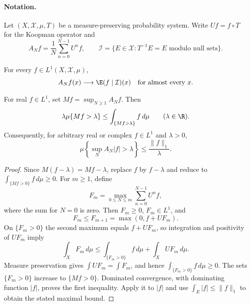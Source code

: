 
\paragraph{Notation.}
Let $(X,\mathcal X,\mu,T)$ be a measure-preserving probability system.
Write $Uf=f\circ T$ for the Koopman operator and
\[
 A_Nf=\frac1N\sum_{n=0}^{N-1}U^nf,
 \qquad \mathcal I=\{E\in\mathcal X:T^{-1}E=E\text{ modulo null sets}\}.
\]
\begin{theorem}
For every $f\in L^1(X,\mathcal X,\mu)$,
\[
 A_Nf(x)\longrightarrow\E(f\mid\mathcal I)(x)
 \quad\text{for almost every }x.
\]
\end{theorem}

\begin{lemma}
For real $f\in L^1$, set $Mf=\sup_{N\geq1}A_Nf$. Then
\[
 \lambda\mu\{Mf>\lambda\}\leq\int_{\{Mf>\lambda\}}f\,d\mu
 \qquad(\lambda\in\R).
\]
Consequently, for arbitrary real or complex $f\in L^1$ and $\lambda>0$,
\[
 \mu\left\{\sup_N A_N|f|>\lambda\right\}\leq\frac{\|f\|_1}{\lambda}.
\]
\end{lemma}
\begin{proof}
Since $M(f-\lambda)=Mf-\lambda$, replace $f$ by $f-\lambda$ and reduce to
$\int_{\{Mf>0\}}f\,d\mu\geq0$. For $m\geq1$, define
\[
 F_m=\max_{0\leq N\leq m}\sum_{n=0}^{N-1}U^nf,
\]
where the sum for $N=0$ is zero. Then $F_m\geq0$, $F_m\in L^1$, and
\[
 F_m\leq F_{m+1}=\max(0,f+UF_m).
\]
On $\{F_m>0\}$ the second maximum equals $f+UF_m$, so integration and
positivity of $UF_m$ imply
\[
 \int_XF_m\,d\mu
 \leq\int_{\{F_m>0\}}f\,d\mu+\int_XUF_m\,d\mu.
\]
Measure preservation gives $\int UF_m=\int F_m$, and hence
$\int_{\{F_m>0\}}f\,d\mu\geq0$.
The sets $\{F_m>0\}$ increase to $\{Mf>0\}$. Dominated convergence,
with dominating function $|f|$, proves the first inequality. Apply it to
$|f|$ and use $\int_E|f|\leq\|f\|_1$ to obtain the stated maximal bound.
\end{proof}

